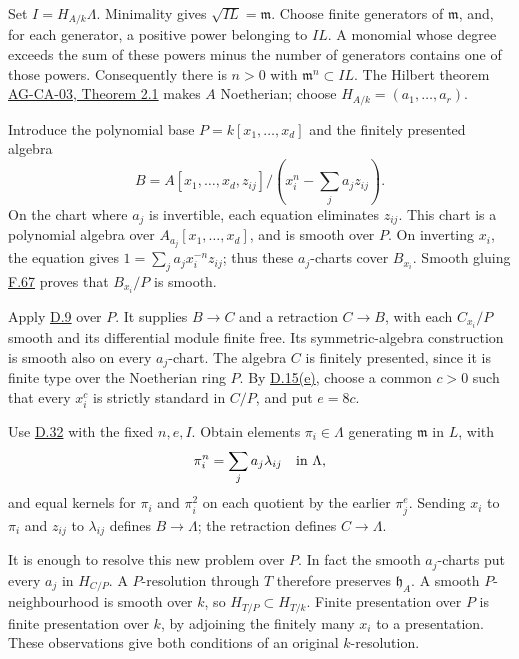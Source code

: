 \documentclass[11pt,a4paper,openany]{report}
\begin{document}
Set \(I=H_{A/k}\Lambda\). Minimality gives \(\sqrt{IL}=\mathfrak m\). Choose finite generators of \(\mathfrak m\), and, for each generator, a positive power belonging to \(IL\). A monomial whose degree exceeds the sum of these powers minus the number of generators contains one of those powers. Consequently there is \(n>0\) with \(\mathfrak m^n\subset IL\). The Hilbert theorem \href{https://github.com/KokunoYumeto/open-math-courses/blob/d02d0a3669f42579db037cd44de1d113fdd770a1/docs/courses/AG-CA/src/noetherian-and-artinian-rings.md}{AG-CA-03, Theorem 2.1} makes \(A\) Noetherian; choose \(H_{A/k}=(a_1,\ldots,a_r)\).

Introduce the polynomial base \(P=k[x_1,\ldots,x_d]\) and the finitely presented algebra \[
B=A[x_1,\ldots,x_d,z_{ij}]/(x_i^n-\sum_j a_jz_{ij}).
\] On the chart where \(a_j\) is invertible, each equation eliminates \(z_{ij}\). This chart is a polynomial algebra over \(A_{a_j}[x_1,\ldots,x_d]\), and is smooth over \(P\). On inverting \(x_i\), the equation gives \(1=\sum_j a_jx_i^{-n}z_{ij}\); thus these \(a_j\)-charts cover \(B_{x_i}\). Smooth gluing \hyperref[AG-RG-S05-algebra-lemma-locally-smooth]{F.67} proves that \(B_{x_i}/P\) is smooth.

Apply \hyperref[AG-RG-S05-smoothing-lemma-improve-presentation]{D.9} over \(P\). It supplies \(B\to C\) and a retraction \(C\to B\), with each \(C_{x_i}/P\) smooth and its differential module finite free. Its symmetric-algebra construction is smooth also on every \(a_j\)-chart. The algebra \(C\) is finitely presented, since it is finite type over the Noetherian ring \(P\). By \hyperref[AG-RG-S05-smoothing-lemma-compare-standard]{D.15(e)}, choose a common \(c>0\) such that every \(x_i^c\) is strictly standard in \(C/P\), and put \(e=8c\).

Use \hyperref[AG-RG-S05-smoothing-lemma-find-sequence]{D.32} with the fixed \(n,e,I\). Obtain elements \(\pi_i\in\Lambda\) generating \(\mathfrak m\) in \(L\), with \[
\pi_i^n=\sum_j a_j\lambda_{ij}
\quad\hbox{in }\Lambda,
\] and equal kernels for \(\pi_i\) and \(\pi_i^2\) on each quotient by the earlier \(\pi_j^e\). Sending \(x_i\) to \(\pi_i\) and \(z_{ij}\) to \(\lambda_{ij}\) defines \(B\to\Lambda\); the retraction defines \(C\to\Lambda\).

It is enough to resolve this new problem over \(P\). In fact the smooth \(a_j\)-charts put every \(a_j\) in \(H_{C/P}\). A \(P\)-resolution through \(T\) therefore preserves \(\mathfrak h_A\). A smooth \(P\)-neighbourhood is smooth over \(k\), so \(H_{T/P}\subset H_{T/k}\). Finite presentation over \(P\) is finite presentation over \(k\), by adjoining the finitely many \(x_i\) to a presentation. These observations give both conditions of an original \(k\)-resolution.
\end{document}
